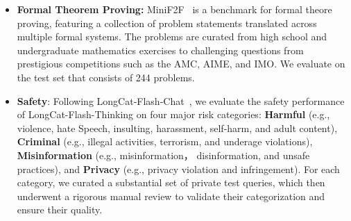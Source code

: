 \begin{itemize}
    SWE-Bench~\citep{jimenez2024swebench}, sourced from real GitHub issues for evaluating a model's ability to solve software engineering problems. 
    BFCL~\citep{BFCL}, 
    and $\tau^2$-Bench~\citep{barres2025tau2} are Tool-Augmented Reasoning benchmarks. VitaBench~\citep{meituan2025longcat_flash_chat}, our self-designed comprehensive real-world benchmark for systematically evaluating models’ capabilities in addressing complex real-world tasks. 
    \item\textbf{Formal Theorem Proving: }MiniF2F~\citep{zheng2021minif2f} is a benchmark for formal theore proving, featuring a collection of problem statements translated across multiple formal systems. The problems are curated from high school and undergraduate mathematics exercises to challenging questions from prestigious competitions such as the AMC, AIME, and IMO. We evaluate on the test set that consists of 244 problems.
    \item\textbf{Safety}: Following LongCat-Flash-Chat~\citep{meituan2025longcat_flash_chat}, we evaluate the safety performance of LongCat-Flash-Thinking on four major risk categories: \textbf{Harmful} (e.g., violence, hate Speech, insulting, harassment, self-harm, and adult content), \textbf{Criminal} (e.g., illegal activities, terrorism, and underage violations), \textbf{Misinformation} (e.g., misinformation， disinformation, and unsafe practices), and \textbf{Privacy} (e.g., privacy violation and infringement). For each category, we curated a substantial set of private test queries, which then underwent a rigorous manual review to validate their categorization and ensure their quality.
    
    
\end{itemize}

